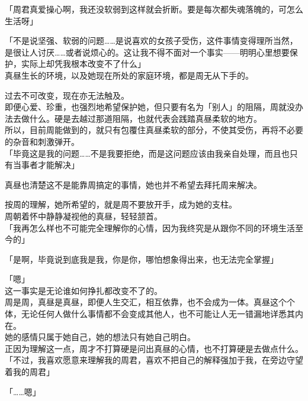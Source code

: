 「周君真爱操心啊，我还没软弱到这样就会折断。要是每次都失魂落魄的，可怎么生活呀」

「不是说坚强、软弱的问题……是说喜欢的女孩子受伤，这件事情变得理所当然，是很让人讨厌……或者说烦心的。这让我不得不面对一个事实——明明心里想要保护，实际上却凭我根本改变不了什么」\\

真昼生长的环境，以及她现在所处的家庭环境，都是周无从下手的。

过去不可改变，现在亦无法触及。\\

即便心爱、珍重，也强烈地希望保护她，但只要有名为「别人」的阻隔，周就没办法去做什么。硬是去越过那道阻隔，也就代表会践踏真昼柔软的地方。\\

所以，目前周能做到的，就只有包覆住真昼柔软的部分，不使其受伤，再将不必要的杂音和刺激弹开。\\

「毕竟这是我的问题……不是我要拒绝，而是这问题应该由我亲自处理，而且也只有当事者才能解决」

真昼也清楚这不是能靠周搞定的事情，她也并不希望去拜托周来解决。

按周的理解，她所希望的，就是周不要放开手，成为她的支柱。\\

周朝着怀中静静凝视他的真昼，轻轻颔首。\\

「我再怎么样也不可能完全理解你的心情，因为我终究是从跟你不同的环境生活至今的」

「是啊，毕竟说到底我是我，你是你，哪怕想象得出来，也无法完全掌握」

「嗯」\\

这一事实是无论谁如何挣扎都改变不了的。\\

周是周，真昼是真昼，即便人生交汇，相互依靠，也不会成为一体。真昼这个个体，无论任何人做什么事情都不会变成其他人，也不可能让人无一错漏地详悉其内在。\\

她的感情只属于她自己，她的想法只有她自己明白。\\

正因为理解这一点，周才不打算硬是问出真昼的心情，也不打算硬是去做点什么。\\

「不过，我喜欢愿意来理解我的周君，喜欢不把自己的解释强加于我，在旁边守望着我的周君」

「……嗯」

